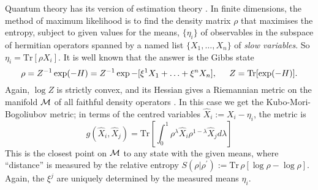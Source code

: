 Quantum theory has its version of estimation theory \cite{Holevo,Ohya}.
In finite dimensions, the method of maximum likelihood is to find the
density
matrix $\rho$ that maximises the entropy, subject to given values for
the means, $\{\eta_i\}$ of observables in the subspace of hermitian operators
spanned by a named list $\{X_1,\ldots,X_n\}$ of {\em slow variables}.
So $\eta_i=\mbox{Tr}[\rho X_i]$. It is well known
that the answer is the Gibbs state
\begin{equation}
\rho=Z^{-1}\exp(-H)=Z^{-1}\exp-[\xi^1X_1+\ldots+\xi^nX_n],\hspace{.2in}
Z=\mbox{Tr}[\exp(-H)].
\end{equation}
Again, $\log Z$ is strictly convex, and its Hessian gives a Riemannian
metric on the manifold ${\cal M}$ of all faithful density operators
\cite{Ingarden4,Chentsov,Petz2}. In this case we get the
Kubo-Mori-Bogoliubov metric; in terms of the centred variables
$\hat{X}_i:=X_i-\eta_i$,
the metric is
\begin{equation}
g(\hat{X}_i,\hat{X}_j)=\mbox{Tr}\left[\int_0^1\rho^\lambda\hat{X}_i\rho^
{1-\lambda}\hat{X}_jd\lambda\right]
\end{equation}
This is the closest point on ${\cal M}$ to any state with the given
means, where ``distance'' is measured by the relative entropy $S(\rho|
\rho^\prime):=\mbox{Tr}\,\rho[\log\rho-\log\rho]$.
Again, the $\xi^j$ are uniquely determined by
the measured means $\eta_i$.


\newpage


